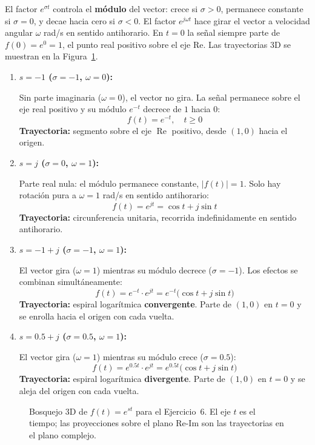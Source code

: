 \documentclass[10pt,a4paper]{article}
\begin{document}
El factor $e^{\sigma t}$ controla el \textbf{módulo} del vector: crece si $\sigma>0$, permanece constante si $\sigma=0$, y decae hacia cero si $\sigma<0$. El factor $e^{j\omega t}$ hace girar el vector a velocidad angular $\omega$ rad/s en sentido antihorario. En $t=0$ la señal siempre parte de $f(0)=e^0=1$, el punto real positivo sobre el eje Re. Las trayectorias 3D se muestran en la Figura~\ref{fig:ejer6_tray}.

\begin{enumerate}[label=\textbf{\alph*)}]
	\item \textbf{$s = -1$ \;($\sigma=-1$, $\omega=0$):}

	Sin parte imaginaria ($\omega=0$), el vector no gira. La señal permanece sobre el eje real positivo y su módulo $e^{-t}$ decrece de $1$ hacia $0$:
	\[f(t) = e^{-t}, \quad t\geq 0\]
	\textbf{Trayectoria:} segmento sobre el eje $\operatorname{Re}$ positivo, desde $(1,0)$ hacia el origen.

	\item \textbf{$s = j$ \;($\sigma=0$, $\omega=1$):}

	Parte real nula: el módulo permanece constante, $|f(t)|=1$. Solo hay rotación pura a $\omega=1$ rad/s en sentido antihorario:
	\[f(t) = e^{jt} = \cos t + j\sin t\]
	\textbf{Trayectoria:} circunferencia unitaria, recorrida indefinidamente en sentido antihorario.

	\item \textbf{$s = -1+j$ \;($\sigma=-1$, $\omega=1$):}

	El vector gira ($\omega=1$) mientras su módulo decrece ($\sigma=-1$). Los efectos se combinan simultáneamente:
	\[f(t) = e^{-t}\cdot e^{jt} = e^{-t}\bigl(\cos t + j\sin t\bigr)\]
	\textbf{Trayectoria:} espiral logarítmica \textbf{convergente}. Parte de $(1,0)$ en $t=0$ y se enrolla hacia el origen con cada vuelta.

	\item \textbf{$s = 0.5+j$ \;($\sigma=0.5$, $\omega=1$):}

	El vector gira ($\omega=1$) mientras su módulo crece ($\sigma=0.5$):
	\[f(t) = e^{0.5t}\cdot e^{jt} = e^{0.5t}\bigl(\cos t + j\sin t\bigr)\]
	\textbf{Trayectoria:} espiral logarítmica \textbf{divergente}. Parte de $(1,0)$ en $t=0$ y se aleja del origen con cada vuelta.
\end{enumerate}

\begin{figure}[H]
	\centering
	\begin{minipage}{\linewidth}
		\centering
		
		\caption{Bosquejo 3D de $f(t)=e^{st}$ para el Ejercicio~6. El eje $t$ es el tiempo; las proyecciones sobre el plano Re-Im son las trayectorias en el plano complejo.}
		\label{fig:ejer6_tray}
	\end{minipage}
\end{figure}
\end{document}

